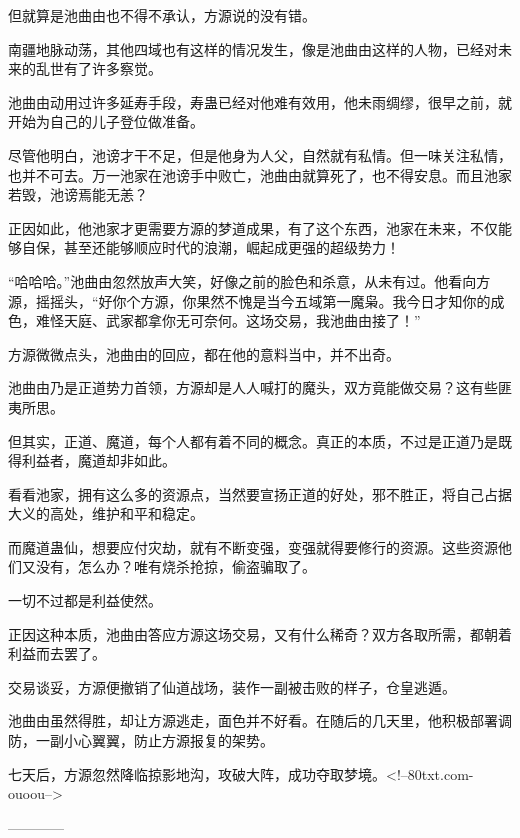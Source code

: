 \begin{this_body}
但就算是池曲由也不得不承认，方源说的没有错。

南疆地脉动荡，其他四域也有这样的情况发生，像是池曲由这样的人物，已经对未来的乱世有了许多察觉。

池曲由动用过许多延寿手段，寿蛊已经对他难有效用，他未雨绸缪，很早之前，就开始为自己的儿子登位做准备。

尽管他明白，池谤才干不足，但是他身为人父，自然就有私情。但一味关注私情，也并不可去。万一池家在池谤手中败亡，池曲由就算死了，也不得安息。而且池家若毁，池谤焉能无恙？

正因如此，他池家才更需要方源的梦道成果，有了这个东西，池家在未来，不仅能够自保，甚至还能够顺应时代的浪潮，崛起成更强的超级势力！

“哈哈哈。”池曲由忽然放声大笑，好像之前的脸色和杀意，从未有过。他看向方源，摇摇头，“好你个方源，你果然不愧是当今五域第一魔枭。我今日才知你的成色，难怪天庭、武家都拿你无可奈何。这场交易，我池曲由接了！”

方源微微点头，池曲由的回应，都在他的意料当中，并不出奇。

池曲由乃是正道势力首领，方源却是人人喊打的魔头，双方竟能做交易？这有些匪夷所思。

但其实，正道、魔道，每个人都有着不同的概念。真正的本质，不过是正道乃是既得利益者，魔道却非如此。

看看池家，拥有这么多的资源点，当然要宣扬正道的好处，邪不胜正，将自己占据大义的高处，维护和平和稳定。

而魔道蛊仙，想要应付灾劫，就有不断变强，变强就得要修行的资源。这些资源他们又没有，怎么办？唯有烧杀抢掠，偷盗骗取了。

一切不过都是利益使然。

正因这种本质，池曲由答应方源这场交易，又有什么稀奇？双方各取所需，都朝着利益而去罢了。

交易谈妥，方源便撤销了仙道战场，装作一副被击败的样子，仓皇逃遁。

池曲由虽然得胜，却让方源逃走，面色并不好看。在随后的几天里，他积极部署调防，一副小心翼翼，防止方源报复的架势。

七天后，方源忽然降临掠影地沟，攻破大阵，成功夺取梦境。<!--80txt.com-ouoou-->

------------

\end{this_body}


